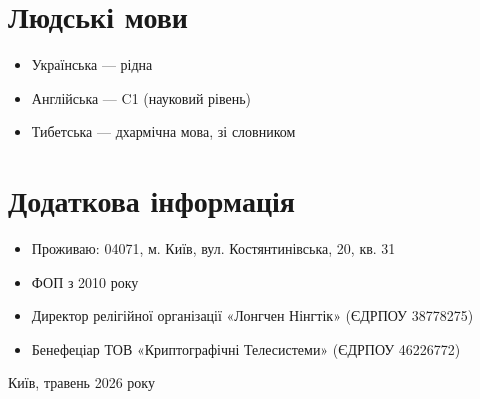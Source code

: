 \documentclass{article}
\begin{document}
\section{Людські мови}
\begin{itemize}[leftmargin=*]
    \item Українська — рідна
    \item Англійська — C1 (науковий рівень)
    \item Тибетська — дхармічна мова, зі словником
\end{itemize}

\section{Додаткова інформація}
\begin{itemize}[leftmargin=*]
    \item Проживаю: 04071, м. Київ, вул. Костянтинівська, 20, кв. 31
    \item ФОП з 2010 року
    \item Директор релігійної організації «Лонгчен Нінгтік» (ЄДРПОУ 38778275)
    \item Бенефеціар ТОВ «Криптографічні Телесистеми» (ЄДРПОУ 46226772)
\end{itemize}

\vspace{1.2em}
\begin{center}
    \small Київ, травень 2026 року
\end{center}
\end{document}
